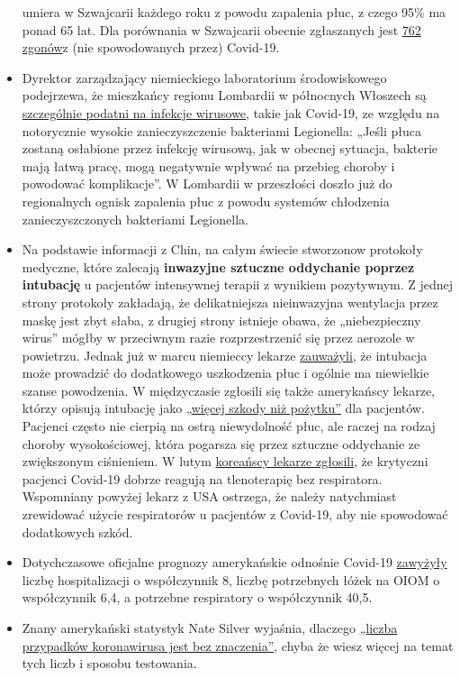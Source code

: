 \begin{itemize}
  umiera w Szwajcarii każdego roku z powodu zapalenia płuc, z czego 95\%
  ma ponad 65 lat. Dla porównania w Szwajcarii obecnie zgłaszanych jest
  \href{https://www.corona-data.ch/}{762 zgonów}z (nie spowodowanych
  przez) Covid-19.
\item
  Dyrektor zarządzający niemieckiego laboratorium środowiskowego
  podejrzewa, że mieszkańcy regionu Lombardii w północnych Włoszech są
  \href{https://m.apotheke-adhoc.de/nachrichten/detail/coronavirus/erhoehen-legionellen-die-todesrate-einer-corona-infektion/}{szczególnie
  podatni na infekcje wirusowe}, takie jak Covid-19, ze względu na
  notorycznie wysokie zanieczyszczenie bakteriami Legionella: „Jeśli
  płuca zostaną osłabione przez infekcję wirusową, jak w obecnej
  sytuacja, bakterie mają łatwą pracę, mogą negatywnie wpływać na
  przebieg choroby i powodować komplikacje''. W Lombardii w przeszłości
  doszło już do regionalnych ognisk zapalenia płuc z powodu systemów
  chłodzenia zanieczyszczonych bakteriami Legionella.
\item
  Na podstawie informacji z Chin, na całym świecie stworzonow protokoły
  medyczne, które zalecają \textbf{inwazyjne sztuczne oddychanie poprzez
  intubację} u pacjentów intensywnej terapii z wynikiem pozytywnym. Z
  jednej strony protokoły zakładają, że delikatniejsza nieinwazyjna
  wentylacja przez maskę jest zbyt słaba, z drugiej strony istnieje
  obawa, że „niebezpieczny wirus'' mógłby w przeciwnym razie
  rozprzestrzenić się przez aerozole w powietrzu. Jednak już w marcu
  niemieccy lekarze
  \href{https://www.doccheck.com/de/detail/articles/26271-covid-19-beatmung-und-dann}{zauważyli},
  że intubacja może prowadzić do dodatkowego uszkodzenia płuc i ogólnie
  ma niewielkie szanse powodzenia. W międzyczasie zgłosili się także
  amerykańscy lekarze, którzy opisują intubację jako
  \href{https://www.youtube.com/watch?v=k9GYTc53r2o}{„więcej szkody niż
  pożytku''} dla pacjentów. Pacjenci często nie cierpią na ostrą
  niewydolność płuc, ale raczej na rodzaj choroby wysokościowej, która
  pogarsza się przez sztuczne oddychanie ze zwiększonym ciśnieniem. W
  lutym
  \href{https://www.upi.com/Top_News/World-News/2020/02/14/Oxygen-therapy-working-for-coronavirus-patient-Seoul-says/6651581696794/}{koreańscy
  lekarze zgłosili}, że krytyczni pacjenci Covid-19 dobrze reagują na
  tlenoterapię bez respiratora. Wspomniany powyżej lekarz z USA
  ostrzega, że należy natychmiast zrewidować użycie respiratorów u
  pacjentów z Covid-19, aby nie spowodować dodatkowych szkód.
\item
  Dotychczasowe oficjalne prognozy amerykańskie odnośnie Covid-19
  \href{https://twitter.com/NikolovScience/status/1246823479820693505}{zawyżyły}
  liczbę hospitalizacji o współczynnik 8, liczbę potrzebnych łóżek na
  OIOM o współczynnik 6,4, a potrzebne respiratory o współczynnik 40,5.
\item
  Znany amerykański statystyk Nate Silver wyjaśnia, dlaczego
  \href{https://fivethirtyeight.com/features/coronavirus-case-counts-are-meaningless/}{„liczba
  przypadków koronawirusa jest bez znaczenia''}, chyba że wiesz więcej
  na temat tych liczb i sposobu testowania.
\end{itemize}

